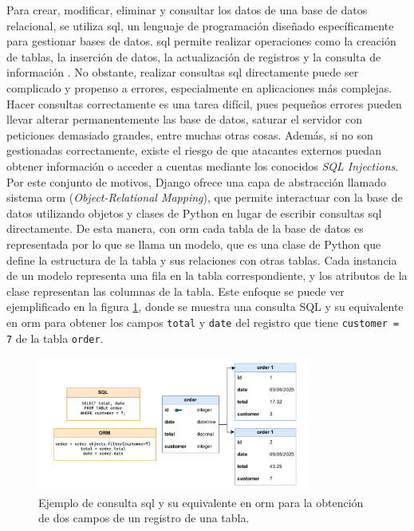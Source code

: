 Para crear, modificar, eliminar y consultar los datos de una base de datos relacional, se utiliza \gls{sql}, un lenguaje de programación diseñado específicamente para gestionar bases de datos. \gls{sql} permite realizar operaciones como la creación de tablas, la inserción de datos, la actualización de registros y la consulta de información \cite{aws_sql}. No obstante, realizar consultas \gls{sql} directamente puede ser complicado y propenso a errores, especialmente en aplicaciones más complejas. Hacer consultas correctamente es una tarea difícil, pues pequeños errores pueden llevar alterar permanentemente las base de datos, saturar el servidor con peticiones demasiado grandes, entre muchas otras cosas. Además, si no son gestionadas correctamente, existe el riesgo de que atacantes externos puedan obtener información o acceder a cuentas mediante los conocidos \textit{SQL Injections}. Por este conjunto de motivos, Django ofrece una capa de abstracción llamado sistema \gls{orm} (\textit{Object-Relational Mapping}), que permite interactuar con la base de datos utilizando objetos y clases de Python en lugar de escribir consultas \gls{sql} directamente. De esta manera, con \gls{orm} cada tabla de la base de datos es representada por lo que se llama un modelo, que es una clase de Python que define la estructura de la tabla y sus relaciones con otras tablas. Cada instancia de un modelo representa una fila en la tabla correspondiente, y los atributos de la clase representan las columnas de la tabla. Este enfoque se puede ver ejemplificado en la figura \ref{fig:orm_vs_sql}, donde se muestra una consulta SQL y su equivalente en \gls{orm} para obtener los campos \texttt{total} y \texttt{date} del registro que tiene \texttt{customer = 7} de la tabla \texttt{order}.

\begin{figure}[H]
    \centering
    \includegraphics[width=0.8\textwidth]{figures/theoric_frame/orm_vs_sql.pdf}
    \caption{Ejemplo de consulta \gls{sql} y su equivalente en \gls{orm} para la obtención de dos campos de un registro de una tabla.}
    \label{fig:orm_vs_sql}
\end{figure}

